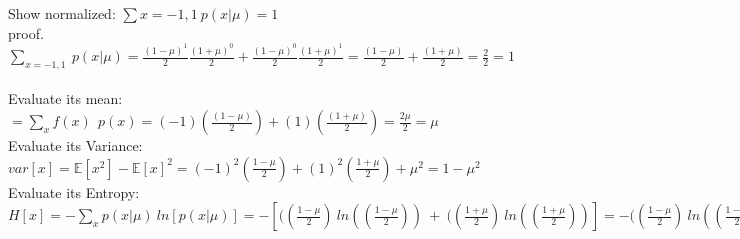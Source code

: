 \documentclass[11pt,leqno,fleqn]{article}
\begin{document}
 Show normalized: $\sum\limits{x = -1,1} \ p(x| \mu) = 1$\\
 proof.\\
 $\sum\limits_{x = -1,1} \ p(x| \mu) = \frac{(1- \mu)^1}{2}\frac{ (1+ \mu)^0}{2} + \frac{(1- \mu)^0}{2}\frac{ (1+ \mu)^1}{2} =  \frac{(1- \mu)}{2} +  \frac{(1 + \mu)}{2} = \frac{2}{2} = 1 $\\
\\
Evaluate its mean:\\
 $ =  \sum\limits_{x} f(x) \ \  p(x) = (-1)(\frac{(1- \mu)}{2}) + (1)(\frac{(1+ \mu)}{2}) = \frac{2 \mu}{2} = \mu$
\\
Evaluate its Variance:\\
$var[x] = \mathbb{E}[x^2] - \mathbb{E}[x]^2 = (-1)^2(\frac{1- \mu}{2}) + (1)^2(\frac{1 + \mu}{2}) + \mu ^2 = 1 - \mu ^2$\\
Evaluate its Entropy:\\
$H[x] =  - \sum\limits_{x} p(x | \mu)  \ ln[p(x | \mu)]  = - [  ((\frac{1- \mu}{2}) \ ln( (\frac{1- \mu}{2})) \ + \   ((\frac{1+ \mu}{2}) \ ln( (\frac{1+ \mu}{2}))] = -  ((\frac{1- \mu}{2}) \ ln( (\frac{1- \mu}{2})) \ - \   ((\frac{1+ \mu}{2}) \ ln( (\frac{1+ \mu}{2})) $
\end{document}

